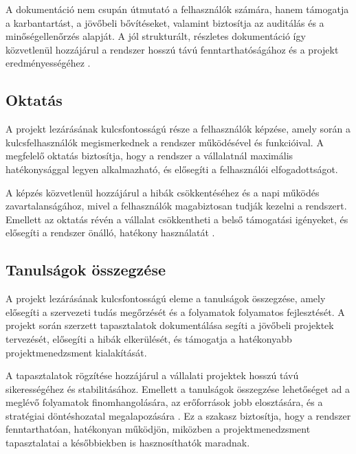 A dokumentáció nem csupán útmutató a felhasználók számára, hanem támogatja a karbantartást, a jövőbeli bővítéseket, valamint biztosítja az auditálás és a minőségellenőrzés alapját.  
A jól strukturált, részletes dokumentáció így közvetlenül hozzájárul a rendszer hosszú távú fenntarthatóságához és a projekt eredményességéhez \cite{Hajdu2014,Kaposi2019}.


\subsection{Oktatás}

A projekt lezárásának kulcsfontosságú része a felhasználók képzése, amely során a kulcsfelhasználók megismerkednek a rendszer működésével és funkcióival.  
A megfelelő oktatás biztosítja, hogy a rendszer a vállalatnál maximális hatékonysággal legyen alkalmazható, és elősegíti a felhasználói elfogadottságot.  

A képzés közvetlenül hozzájárul a hibák csökkentéséhez és a napi működés zavartalanságához, mivel a felhasználók magabiztosan tudják kezelni a rendszert.  
Emellett az oktatás révén a vállalat csökkentheti a belső támogatási igényeket, és elősegíti a rendszer önálló, hatékony használatát \cite{Szalay2018,Kovacs2016}.


\subsection{Tanulságok összegzése}

A projekt lezárásának kulcsfontosságú eleme a tanulságok összegzése, amely elősegíti 
a szervezeti tudás megőrzését és a folyamatok folyamatos fejlesztését.
A projekt során szerzett tapasztalatok dokumentálása segíti a jövőbeli projektek 
tervezését, elősegíti a hibák elkerülését, és támogatja a hatékonyabb projektmenedzsment kialakítását.  

A tapasztalatok rögzítése hozzájárul a vállalati projektek hosszú távú sikerességéhez és stabilitásához.  
Emellett a tanulságok összegzése lehetőséget ad a meglévő folyamatok finomhangolására, az erőforrások jobb elosztására, 
és a stratégiai döntéshozatal megalapozására \cite{Hajdu2014,Szalay2018,Kaposi2019}.  
Ez a szakasz biztosítja, hogy a rendszer fenntarthatóan, hatékonyan működjön, miközben 
a projektmenedzsment tapasztalatai a későbbiekben is hasznosíthatók maradnak.

